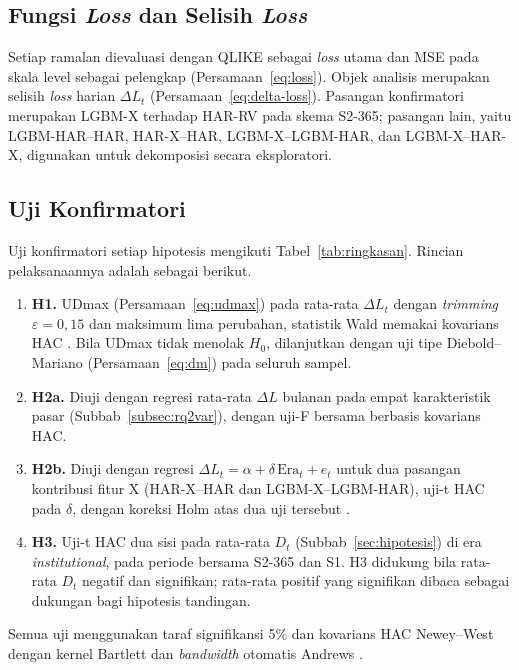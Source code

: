 \subsection{Fungsi \textit{Loss} dan Selisih \textit{Loss}}
Setiap ramalan dievaluasi dengan QLIKE sebagai \textit{loss} utama dan MSE
pada skala level sebagai pelengkap (Persamaan~\eqref{eq:loss}). Objek analisis
merupakan selisih \textit{loss} harian $\Delta L_t$
(Persamaan~\eqref{eq:delta-loss}). Pasangan konfirmatori merupakan LGBM-X
terhadap HAR-RV pada skema S2-365; pasangan lain, yaitu LGBM-HAR--HAR,
HAR-X--HAR, LGBM-X--LGBM-HAR, dan LGBM-X--HAR-X, digunakan untuk dekomposisi
secara eksploratori.

\subsection{Uji Konfirmatori}
Uji konfirmatori setiap hipotesis mengikuti Tabel~\ref{tab:ringkasan}.
Rincian pelaksanaannya adalah sebagai berikut.
\begin{enumerate}
  \item \textbf{H1.} UDmax (Persamaan~\eqref{eq:udmax}) pada rata-rata
        $\Delta L_t$ dengan \textit{trimming} $\varepsilon = 0{,}15$ dan
        maksimum lima perubahan, statistik Wald memakai kovarians HAC
        \cite{bai1998,bai2003,martins2016}. Bila UDmax tidak menolak $H_0$,
        dilanjutkan dengan uji tipe Diebold--Mariano
        (Persamaan~\eqref{eq:dm}) pada seluruh sampel.
  \item \textbf{H2a.} Diuji dengan regresi rata-rata $\Delta L$ bulanan
        pada empat karakteristik pasar (Subbab~\ref{subsec:rq2var}), dengan
        uji-F bersama berbasis kovarians HAC.
  \item \textbf{H2b.} Diuji dengan regresi
        $\Delta L_t = \alpha + \delta\,\text{Era}_t + e_t$ untuk dua
        pasangan kontribusi fitur X (HAR-X--HAR dan LGBM-X--LGBM-HAR), uji-t
        HAC pada $\delta$, dengan koreksi Holm atas dua uji tersebut
        \cite{holm1979}.
  \item \textbf{H3.} Uji-t HAC dua sisi pada rata-rata $D_t$ (Subbab~\ref{sec:hipotesis}) di
        era \textit{institutional}, pada periode bersama S2-365 dan S1. H3
        didukung bila rata-rata $D_t$ negatif dan signifikan; rata-rata
        positif yang signifikan dibaca sebagai dukungan bagi hipotesis
        tandingan.
\end{enumerate}

Semua uji menggunakan taraf signifikansi 5\% dan kovarians HAC Newey--West
dengan kernel Bartlett dan \textit{bandwidth} otomatis Andrews
\cite{newey1987,andrews1991}.

